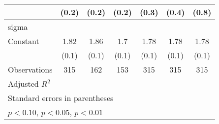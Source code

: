 \begin{table}[htbp]
\begin{tabular}{l*{6}{c}}
                &    (0.2)         &    (0.2)         &    (0.2)         &    (0.3)         &    (0.4)         &    (0.8)         \\
\hline
sigma           &                  &                  &                  &                  &                  &                  \\
Constant        &     1.82\sym{***}&     1.86\sym{***}&      1.7\sym{***}&     1.78\sym{***}&     1.78\sym{***}&     1.78\sym{***}\\
                &    (0.1)         &    (0.1)         &    (0.1)         &    (0.1)         &    (0.1)         &    (0.1)         \\
\hline
Observations    &      315         &      162         &      153         &      315         &      315         &      315         \\
Adjusted \(R^{2}\)&                  &                  &                  &                  &                  &                  \\
\hline\hline
\multicolumn{7}{l}{\footnotesize Standard errors in parentheses}\\
\multicolumn{7}{l}{\footnotesize \sym{*} \(p<0.10\), \sym{**} \(p<0.05\), \sym{***} \(p<0.01\)}\\
\end{tabular}
\end{table}
